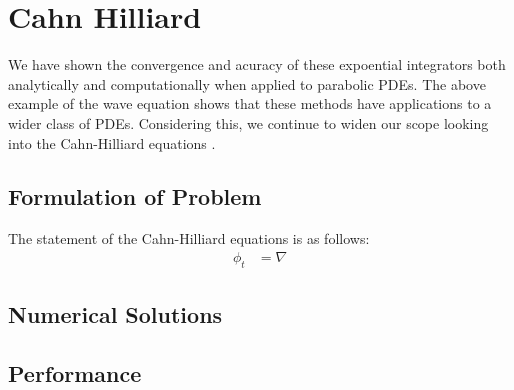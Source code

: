 \section{Cahn Hilliard}
We have shown the convergence and acuracy of these expoential integrators both analytically and computationally when applied to parabolic PDEs.
The above example of the wave equation shows that these methods have applications to a wider class of PDEs.
Considering this, we continue to widen our scope looking into the Cahn-Hilliard equations \cite{Kim2016}.

\subsection{Formulation of Problem}
The statement of the Cahn-Hilliard equations is as follows:
\begin{align*}
\phi_t &= \nabla
\end{align*}

\subsection{Numerical Solutions}

\subsection{Performance}